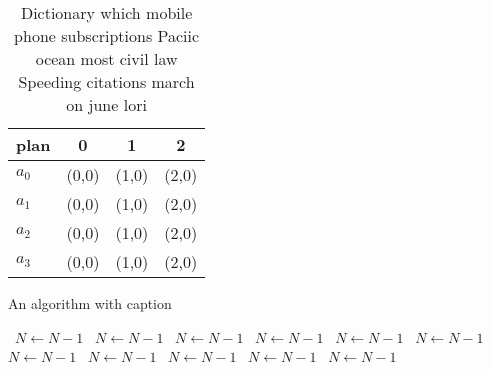 \documentclass[a4paper]{article}
\begin{document}
\begin{table}
\begin{adjustbox}{width=1\columnwidth}
\begin{tabular}{|l|l|l|l|}
\hline
\textbf{plan} & \multicolumn{1}{c|}{\textbf{0}} & \multicolumn{1}{c|}{\textbf{1}} & \multicolumn{1}{c|}{\textbf{2}} \\ \hline
\textbf{$a_0$}  & (0,0) & (1,0) & (2,0) \\ \hline
\textbf{$a_1$}  & (0,0) & (1,0) & (2,0) \\ \hline
\textbf{$a_2$}  & (0,0) & (1,0) & (2,0) \\ \hline
\textbf{$a_3$}  & (0,0) & (1,0) & (2,0) \\ \hline
\end{tabular}
\end{adjustbox}
\caption{Dictionary which mobile phone subscriptions Paciic ocean most civil law Speeding citations march on june lori
}
\end{table}

\begin{algorithm}
\caption{An algorithm with caption}
\begin{algorithmic}
\    \State $N \gets N - 1$
\    \State $N \gets N - 1$
\    \State $N \gets N - 1$
\    \State $N \gets N - 1$
\    \State $N \gets N - 1$
\    \State $N \gets N - 1$
\    \State $N \gets N - 1$
\    \State $N \gets N - 1$
\    \State $N \gets N - 1$
\    \State $N \gets N - 1$
\    \State $N \gets N - 1$
\EndWhile
\end{algorithmic}
\end{algorithm}
\end{document}
